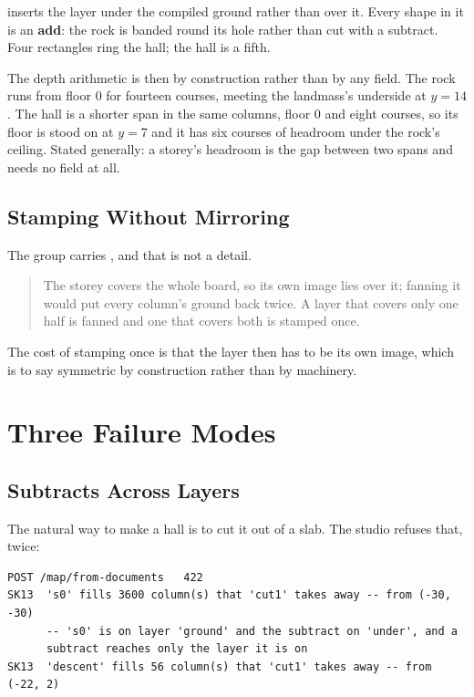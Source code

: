  inserts the layer under the compiled ground rather than over it.
Every shape in it is an \textbf{add}: the rock is banded round its hole rather
than cut with a subtract. Four rectangles ring the hall; the hall is a fifth.

The depth arithmetic is then by construction rather than by any field. The rock
runs from floor 0 for fourteen courses, meeting the landmass's underside at
$y=14$. The hall is a shorter span in the same columns, floor 0 and eight courses,
so its floor is stood on at $y=7$ and it has six courses of headroom under the
rock's ceiling. Stated generally: a storey's headroom is the gap between two spans
and needs no field at all.

\subsection{Stamping Without Mirroring}

The group carries , and that is not a detail.

\begin{quote}
The storey covers the whole board, so its own  image lies over it;
fanning it would put every column's ground back twice. A layer that covers only one
half is fanned and one that covers both is stamped once.
\end{quote}

The cost of stamping once is that the layer then has to be its own image, which is
to say symmetric by construction rather than by machinery.

\section{Three Failure Modes}

\subsection{Subtracts Across Layers}

The natural way to make a hall is to cut it out of a slab. The studio refuses
that, twice:

\begin{lstlisting}
POST /map/from-documents   422
SK13  's0' fills 3600 column(s) that 'cut1' takes away -- from (-30, -30)
      -- 's0' is on layer 'ground' and the subtract on 'under', and a
      subtract reaches only the layer it is on
SK13  'descent' fills 56 column(s) that 'cut1' takes away -- from (-22, 2)
\end{lstlisting}

